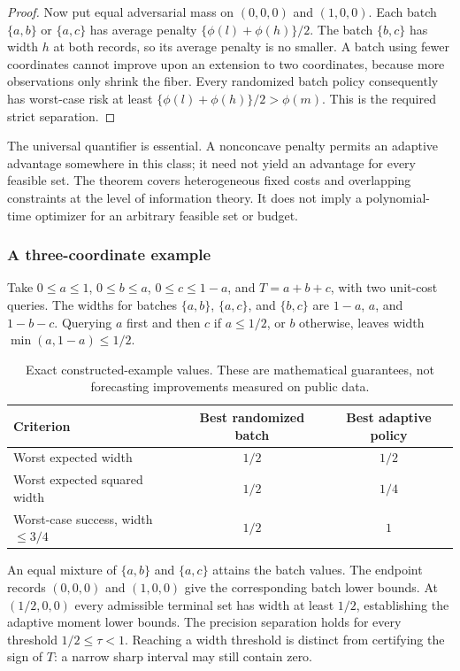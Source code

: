 \documentclass[12pt]{article}
\begin{document}
\begin{proof}
Now put equal adversarial mass on $(0,0,0)$ and $(1,0,0)$.
Each batch $\{a,b\}$ or $\{a,c\}$ has average penalty
$\{\phi(l)+\phi(h)\}/2$. The batch $\{b,c\}$ has width $h$ at both
records, so its average penalty is no smaller. A batch using fewer
coordinates cannot improve upon an extension to two coordinates,
because more observations only shrink the fiber. Every randomized
batch policy consequently has worst-case risk at least
$\{\phi(l)+\phi(h)\}/2>\phi(m)$. This is the required strict separation.
\end{proof}

The universal quantifier is essential. A nonconcave penalty permits an
adaptive advantage somewhere in this class; it need not yield an
advantage for every feasible set. The theorem covers heterogeneous fixed
costs and overlapping constraints at the level of information theory.
It does not imply a polynomial-time optimizer for an arbitrary feasible
set or budget.

\subsubsection{A three-coordinate example}
\label{sec:risk_small_example}
Take $0\le a\le1$, $0\le b\le a$, $0\le c\le1-a$, and
$T=a+b+c$, with two unit-cost queries. The widths for batches
$\{a,b\}$, $\{a,c\}$, and $\{b,c\}$ are $1-a$, $a$, and $1-b-c$.
Querying $a$ first and then $c$ if $a\le1/2$, or $b$ otherwise, leaves
width $\min(a,1-a)\le1/2$.

\begin{table}[htbp]
\centering
\caption{Exact constructed-example values. These are mathematical
guarantees, not forecasting improvements measured on public data.}
\label{tab:risk_three_coordinate}
\begin{tabular}{lcc}
\toprule
Criterion & Best randomized batch & Best adaptive policy\\
\midrule
Worst expected width & $1/2$ & $1/2$\\
Worst expected squared width & $1/2$ & $1/4$\\
Worst-case success, width $\le3/4$ & $1/2$ & $1$\\
\bottomrule
\end{tabular}
\end{table}

An equal mixture of $\{a,b\}$ and $\{a,c\}$ attains the batch values.
The endpoint records $(0,0,0)$ and $(1,0,0)$ give the corresponding
batch lower bounds. At $(1/2,0,0)$ every admissible terminal set has
width at least $1/2$, establishing the adaptive moment lower bounds.
The precision separation holds for every threshold $1/2\le\tau<1$.
Reaching a width threshold is distinct from certifying the sign of $T$:
a narrow sharp interval may still contain zero.
\end{document}

